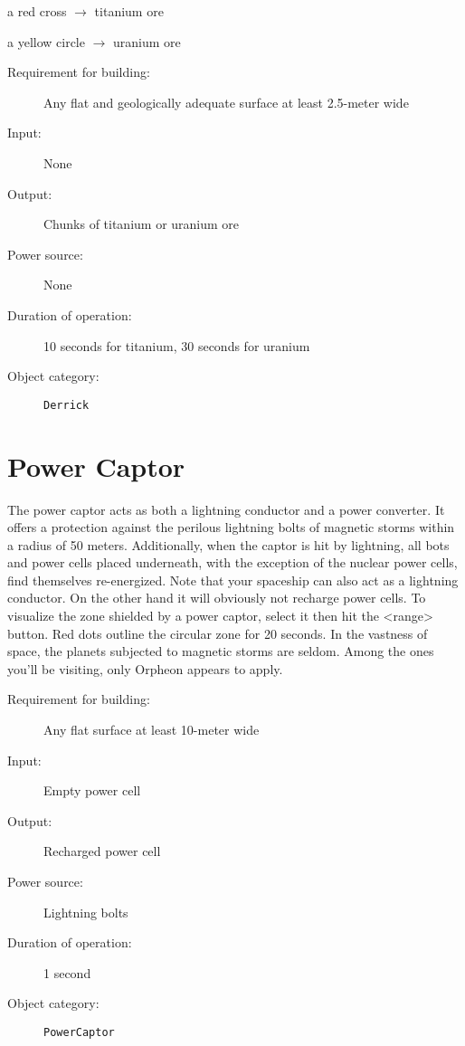 a red cross $\rightarrow$ titanium ore

a yellow circle $\rightarrow$ uranium ore

\begin{description}
    \item[Requirement for building:] Any flat and geologically adequate surface at least 2.5-meter wide
    \item[Input:] None
    \item[Output:] Chunks of titanium or uranium ore
    \item[Power source:] None
    \item[Duration of operation:] 10 seconds for titanium, 30 seconds for uranium
    \item[Object category:] \texttt{Derrick}
\end{description}


\section{Power Captor}

The power captor acts as both a lightning conductor and a power converter. It offers a protection against the perilous lightning bolts of magnetic storms within a radius of 50 meters. Additionally, when the captor is hit by lightning, all bots and power cells placed underneath, with the exception of the nuclear power cells, find themselves re-energized. Note that your spaceship can also act as a lightning conductor. On the other hand it will obviously not recharge power cells. To visualize the zone shielded by a power captor, select it then hit the <range> button. Red dots outline the circular zone for 20 seconds. In the vastness of space, the planets subjected to magnetic storms are seldom. Among the ones you'll be visiting, only Orpheon appears to apply.

\begin{description}
    \item[Requirement for building:] Any flat surface at least 10-meter wide
    \item[Input:] Empty power cell
    \item[Output:] Recharged power cell
    \item[Power source:] Lightning bolts
    \item[Duration of operation:] 1 second
    \item[Object category:] \texttt{PowerCaptor}
\end{description}


